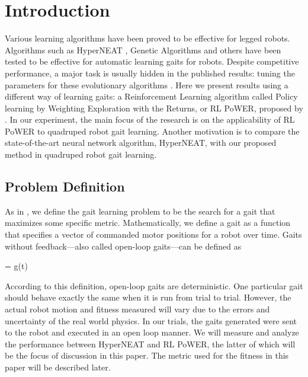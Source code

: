 \section{Introduction}


Various learning algorithms have been proved to be effective for
legged robots. Algorithms such as HyperNEAT
\citep{yosinski2011evolving-robot-gaits}, Genetic Algorithms
\citep{chernova2004an-evolutionary-approach-to-gait} and others
\citep{hornby2005autonomous-evolution-of-dynamic,
  zykov2004evolving-dynamic-gaits,
  tellez2006evolving-the-walking-behaviour,
  valsalam2008modular-neuroevolution-for-multilegged} have been tested
to be effective for automatic learning gaits for robots. Despite
competitive performance, a major task is usually hidden in the
published results: tuning the parameters for these evolutionary
algorithms \citep{kormushev2011bipedal-walking-energy}. Here we
present results using a different way of learning gaits: a
Reinforcement Learning algorithm called Policy learning by Weighting
Exploration with the Returns, or RL PoWER, proposed by
\cite{kober2009learning-motor-primitives}. In our experiment, the main
focus of the research is on the applicability of RL PoWER to quadruped
robot gait learning. Another motivation is to compare the
state-of-the-art neural network algorithm, HyperNEAT, with our
proposed method in quadruped robot gait learning.



\subsection{Problem Definition}

As in \cite{yosinski2011evolving-robot-gaits}, we define the gait learning problem to be the search for a
gait that maximizes some specific metric. Mathematically, we define a
gait as a function that specifies a vector of commanded motor
positions for a robot over time. Gaits without feedback---also
called open-loop gaits---can be defined as 

\be{} = g(t)\ee

According to this definition, open-loop gaits are deterministic. One
particular gait should behave exactly the same when it is run from
trial to trial. However, the actual robot motion and fitness measured
will vary due to the errors and uncertainty of the real world physics. In our
trials, the gaits generated were sent to the robot and
executed in an open loop manner. We will measure and analyze the performance between HyperNEAT and 
RL PoWER, the latter of which will be the focus of discussion in this paper. The metric used for the fitness in this paper will be
described later.
